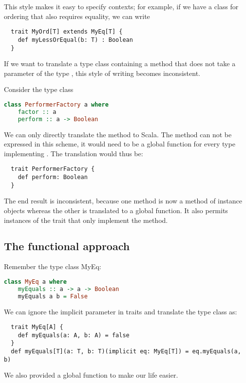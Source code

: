 This style makes it easy to specify contexts; for example, if we have
a class  for ordering that also requires equality, we can write
\begin{lstlisting}
  trait MyOrd[T] extends MyEq[T] {
    def myLessOrEqual(b: T) : Boolean
  }
\end{lstlisting}

If we want to translate a type class containing a method that does not take a
parameter of the type , this style of writing becomes inconsistent.

\begin{example} Consider the type class
\begin{lstlisting}[language=Haskell]
  class PerformerFactory a where
    factor :: a
    perform :: a -> Boolean
\end{lstlisting}
We can only directly translate the  method to Scala. The 
method can not be expressed in this scheme, it would need to be a global
function for every type implementing . The translation
would thus be:
\begin{lstlisting}
  trait PerformerFactory {
    def perform: Boolean
  }
\end{lstlisting}
The end result is inconsistent, because one method is now a method of
instance objects whereas the other is translated to a global function. It
also permits instances of the trait that only implement the 
method.
\end{example}
\subsection{The functional approach}
Remember the type class MyEq:
\begin{lstlisting}[language=Haskell]
  class MyEq a where
    myEquals :: a -> a -> Boolean
    myEquals a b = False
\end{lstlisting}
We can ignore the implicit  parameter in traits and translate the type
class as:
\begin{lstlisting}
  trait MyEq[A] {
    def myEquals(a: A, b: A) = false
  }
  def myEquals[T](a: T, b: T)(implicit eq: MyEq[T]) = eq.myEquals(a, b)
\end{lstlisting}
We also provided a global  function to make our life easier.

